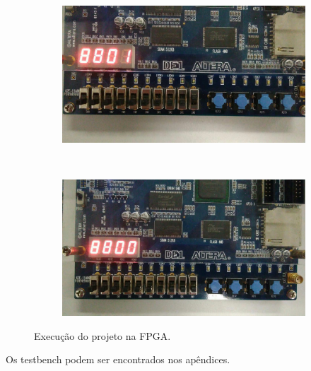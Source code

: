 \begin{figure}[H]
		\begin{subfigure}[b]{0.44\textwidth}
			\includegraphics[width=\textwidth]{img/etapa3/7}
			\label{fig:etapa3-16}
		\end{subfigure}
		~
		\begin{subfigure}[b]{0.44\textwidth}
			\includegraphics[width=\textwidth]{img/etapa3/8}
			\label{fig:etapa3-17}
		\end{subfigure}

		\caption{Execução do projeto na FPGA.}
	\end{figure}



	Os testbench podem ser encontrados nos apêndices.

